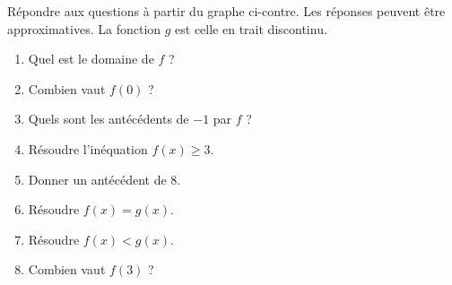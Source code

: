 
\begin{exercice}\label{exosmath-0015}

    \begin{multicols}{2}

        Répondre aux questions à partir du graphe ci-contre. Les réponses peuvent être approximatives. La fonction \( g\) est celle en trait discontinu.
        \begin{enumerate}
            \item
                Quel est le domaine de \( f\) ?
            \item
                Combien vaut \( f(0)\) ?
            \item
                Quels sont les antécédents de \( -1\) par \( f\) ?
            \item
                Résoudre l'inéquation \( f(x)\geq 3\).
            \item
                Donner un antécédent de \( 8\).
            \item
                Résoudre \( f(x)=g(x)\).
            \item
                Résoudre \( f(x)<g(x)\).
            \item
                Combien vaut \( f(3)\) ?
        \end{enumerate}
        
        \columnbreak

        \begin{center}

        \end{center}

    \end{multicols}

\end{exercice}
